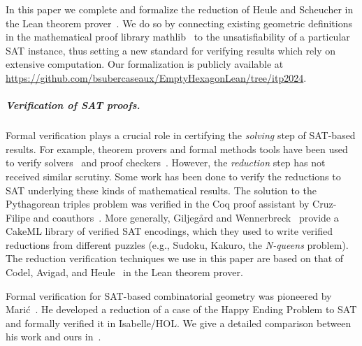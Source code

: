 
In this paper we complete and formalize the reduction of Heule and Scheucher in the Lean theorem prover~\cite{demouraLeanTheoremProver2015}. We do so by connecting existing geometric definitions
in the mathematical proof library \textsf{mathlib}~\cite{The_mathlib_Community_2020}
to the unsatisfiability of a particular SAT instance, thus setting a new standard for verifying results which rely on extensive computation.
Our formalization is publicly available at \url{https://github.com/bsubercaseaux/EmptyHexagonLean/tree/itp2024}.


\subparagraph*{Verification of SAT proofs.}
Formal verification plays a crucial role in certifying the \emph{solving} step of SAT-based results.
For example, theorem provers and formal methods tools have been used to verify solvers~\cite{10maric_formal_verification_modern_sat_solver_shallow_embedding_isabelle_hol,oeVersatVerifiedModern2012,skotam_creusat_2022}
and proof checkers~\cite{lammichEfficientVerifiedSAT2020,tanVerifiedPropagationRedundancy2023}.
However, the \emph{reduction} step has not received similar scrutiny.
Some work has been done to verify the reductions to SAT underlying these kinds of mathematical results.
The solution to the Pythagorean triples problem
was verified in the \textsf{Coq} proof assistant
by Cruz-Filipe and coauthors~\cite{formalPythagoreanTriples,LPAR-21:Formally_Proving_Boolean_Pythagorean}.
More generally,
Giljeg\r{a}rd and Wennerbreck~\cite{GilAndWennerbeck} provide a \textsf{CakeML} library
of verified SAT encodings,
which they used to write verified reductions from different puzzles
(e.g., Sudoku, Kakuro, the \emph{N-queens} problem).
The reduction verification techniques we use in this paper
are based on that of Codel, Avigad, and Heule~\cite{Cayden} in the Lean theorem prover.

Formal verification for SAT-based combinatorial geometry
was pioneered by Marić~\cite{19maric_fast_formal_proof_erdos_szekeres_conjecture_convex_polygons_most_six_points}.
He developed a reduction of a case of the Happy Ending Problem to SAT
and formally verified it in \textsf{Isabelle/HOL}.
We give a detailed comparison between his work and ours in~.

